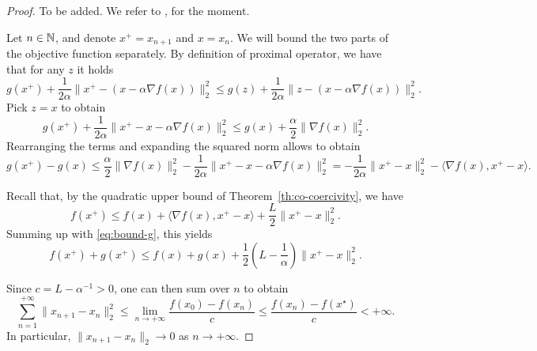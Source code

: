      \begin{proof}
         To be added. We refer to \cite{fawziLecture}, for the moment.
 
         Let $n\in\mathbb{N}$, and denote $x^+=x_{n+1}$ and $x=x_n$.
         We will bound the two parts of the objective function separately.
         By definition of proximal operator, we have that for any $z$ it holds
         \begin{equation}
             g(x^+) + \frac{1}{2\alpha}\|x^+-(x - \alpha \nabla f(x))\|_2^2
             \le g(z) + \frac{1}{2\alpha}\|z-(x - \alpha \nabla f(x))\|_2^2.
         \end{equation}
         Pick $z=x$ to obtain
         \begin{equation}
             g(x^+) + \frac{1}{2\alpha}\|x^+-x - \alpha \nabla f(x)\|_2^2
             \le g(x) + \frac{\alpha}{2}\|\nabla f(x)\|_2^2.
         \end{equation}
         Rearranging the terms and expanding the squared norm allows to obtain
         \begin{equation}
             \label{eq:bound-g}
             g(x^+) - g(x)
             \le\frac{\alpha}{2}\|\nabla f(x)\|_2^2 - \frac{1}{2\alpha}\|x^+-x - \alpha \nabla f(x)\|_2^2
             = -\frac{1}{2\alpha} \|x^+-x\|_2^2 -\langle \nabla f(x),x^+-x\rangle.
         \end{equation}
 
 
         Recall that, by the quadratic upper bound of Theorem~\ref{th:co-coercivity}, we have
         \begin{equation}
             f(x^+) \le f(x) + \langle\nabla f(x),x^+-x\rangle + \frac{L}{2}\|x^+-x\|_2^2.
         \end{equation}
         Summing up with \eqref{eq:bound-g}, this yields
         \begin{equation}
             f(x^+)+g(x^+) \le f(x)+g(x) +\frac{1}2\left(L-\frac1\alpha\right) \|x^+-x\|_2^2.
         \end{equation}
 
         Since $c=L-\alpha^{-1}>0$, one can then sum over $n$ to obtain
         \begin{equation}
             \sum_{n=1}^{+\infty}\|x_{n+1}-x_n\|_2^2  \le \lim_{n\to+\infty} \frac{f(x_0)-f(x_n)}{c} \le\frac{f(x_n)-f(x^\star)}{c}  <+\infty.
         \end{equation}
         In particular, $\|x_{n+1}-x_n\|_2\rightarrow 0$ as $n\to +\infty$.
 

\end{proof}
